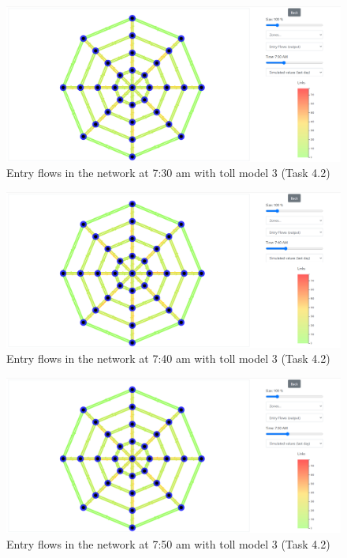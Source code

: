 \documentclass[a4paper, 12pt,oneside]{article}
\begin{document}
\begin{minipage}[c]{0.5\textwidth}
\begin{figure}[H]
    \centering
    \includegraphics[width=1\textwidth]{Images/Step4/results_on_network_task4.2_730am.png}
    \caption{Entry flows in the network at 7:30 am with toll model 3 (Task 4.2)}
    \label{fig:Entry flows in the network at 7:30 am with toll model 3 (Task 4.2)}
\end{figure}
\end{minipage}
\begin{minipage}[c]{0.5\textwidth}
\begin{figure}[H]
    \centering
    \includegraphics[width=1\textwidth]{Images/Step4/results_on_network_task4.2_740am.png}
    \caption{Entry flows in the network at 7:40 am with toll model 3 (Task 4.2)}
    \label{fig:Entry flows in the network at 7:40 am with toll model 3 (Task 4.2)}
\end{figure}
\end{minipage}
\begin{minipage}[c]{0.5\textwidth}
\begin{figure}[H]
    \centering
    \includegraphics[width=1\textwidth]{Images/Step4/results_on_network_task4.2_750am.png}
    \caption{Entry flows in the network at 7:50 am with toll model 3 (Task 4.2)}
    \label{fig:Entry flows in the network at 7:50 am with toll model 3 (Task 4.2)}
\end{figure}
\end{minipage}
\end{document}
